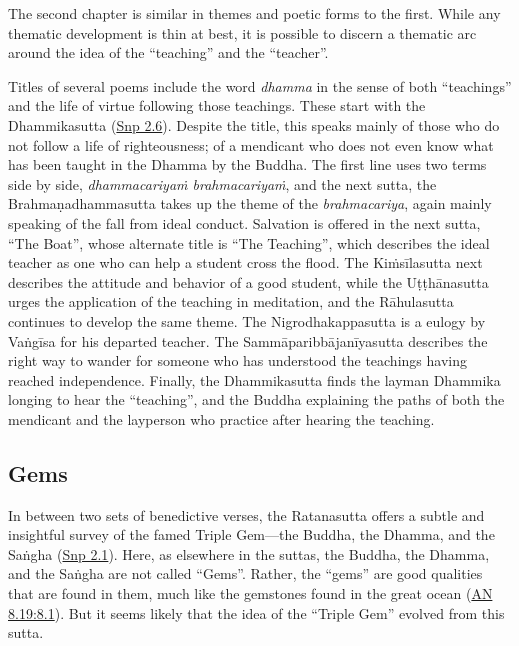 \documentclass[12pt,openany]{book}%
\begin{document}
The second chapter is similar in themes and poetic forms to the first. While any thematic development is thin at best, it is possible to discern a thematic arc around the idea of the “teaching” and the “teacher”.

Titles of several poems include the word \textit{dhamma} in the sense of both “teachings” and the life of virtue following those teachings. These start with the Dhammikasutta (\href{https://suttacentral.net/snp2.6/en/sujato}{Snp 2.6}). Despite the title, this speaks mainly of those who do not follow a life of righteousness; of a mendicant who does not even know what has been taught in the Dhamma by the Buddha. The first line uses two terms side by side, \textit{\textsanskrit{dhammacariyaṁ} \textsanskrit{brahmacariyaṁ}}, and the next sutta, the \textsanskrit{Brahmaṇadhammasutta} takes up the theme of the \textit{brahmacariya}, again mainly speaking of the fall from ideal conduct. Salvation is offered in the next sutta, “The Boat”, whose alternate title is “The Teaching”, which describes the ideal teacher as one who can help a student cross the flood. The \textsanskrit{Kiṁsīlasutta} next describes the attitude and behavior of a good student, while the \textsanskrit{Uṭṭhānasutta} urges the application of the teaching in meditation, and the \textsanskrit{Rāhulasutta} continues to develop the same theme. The Nigrodhakappasutta is a eulogy by \textsanskrit{Vaṅgīsa} for his departed teacher. The \textsanskrit{Sammāparibbājanīyasutta} describes the right way to wander for someone who has understood the teachings having reached independence. Finally, the Dhammikasutta finds the layman Dhammika longing to hear the “teaching”, and the Buddha explaining the paths of both the mendicant and the layperson who practice after hearing the teaching.

\subsection*{Gems}

In between two sets of benedictive verses, the Ratanasutta offers a subtle and insightful survey of the famed Triple Gem—the Buddha, the Dhamma, and the \textsanskrit{Saṅgha} (\href{https://suttacentral.net/snp2.1/en/sujato}{Snp 2.1}). Here, as elsewhere in the suttas, the Buddha, the Dhamma, and the \textsanskrit{Saṅgha} are not called “Gems”. Rather, the “gems” are good qualities that are found in them, much like the gemstones found in the great ocean (\href{https://suttacentral.net/an8.19/en/sujato\#8.1}{AN 8.19:8.1}). But it seems likely that the idea of the “Triple Gem” evolved from this sutta.
\end{document}
